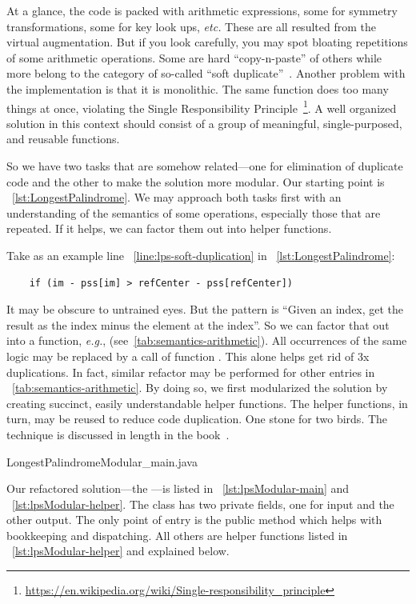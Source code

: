 At a glance, the code is packed with arithmetic expressions, some for symmetry
transformations, some for key look ups, \textit{etc.}
These are all resulted from the virtual augmentation.
But if you look carefully, you may spot bloating repetitions of some arithmetic operations.
Some are hard ``copy-n-paste'' of others while
more belong to the category of so-called ``soft duplicate''~\cite{Wan:book}.
Another problem with the implementation is that it is monolithic.
The same function does too many things at once, violating the Single Responsibility
Principle~\footnote{\url{https://en.wikipedia.org/wiki/Single-responsibility_principle}}.
A well organized solution in this context should consist of a group of meaningful, single-purposed,
and reusable functions.


So we have two tasks that are somehow related---one for elimination of duplicate code and the
other to make the solution more modular.
Our starting point is ~\autoref{lst:LongestPalindrome}.
We may approach both tasks first with an understanding of the semantics of some operations,
especially those that are repeated.
If it helps, we can factor them out into helper functions.


Take as an example line ~\autoref{line:lps-soft-duplication} in ~\autoref{lst:LongestPalindrome}:
\begin{lstlisting}
    if (im - pss[im] > refCenter - pss[refCenter])
\end{lstlisting}
It may be obscure to untrained eyes.
But the pattern is ``Given an index, get the result as the index minus the element
at the index''.
So we can factor that out into a function, \textit{e.g.}, 
(see~\autoref{tab:semantics-arithmetic}).
All occurrences of the same logic may be replaced by a call of function .
This alone helps get rid of $3$x duplications.
In fact, similar refactor may be performed for other entries in
~\autoref{tab:semantics-arithmetic}.
By doing so, we first modularized the solution by creating succinct, easily understandable helper
functions.
The helper functions, in turn, may be reused to reduce code duplication.
One stone for two birds.
The technique is discussed in length in the book~\cite{Wan:book}.



{LongestPalindromeModular_main.java}

Our refactored solution---the ---is listed in
~\autoref{lst:lpsModular-main} and ~\autoref{lst:lpsModular-helper}.
The class has two private fields, one for input and the other output.
The only point of entry is the public method  which
helps with bookkeeping and dispatching.
All others are helper functions listed in ~\autoref{lst:lpsModular-helper} and
explained below.

